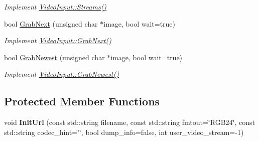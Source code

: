 \begin{DoxyCompactItemize}
\begin{DoxyCompactList}\small\item\em Implement \hyperlink{structpangolin_1_1_video_input_a9030d775d699c39ab7b7ba378c007c6a}{Video\+Input\+::\+Streams()} \end{DoxyCompactList}\item 
bool \hyperlink{classpangolin_1_1_ffmpeg_video_a724f49203ba3d5053edea3a00c227d44}{Grab\+Next} (unsigned char $\ast$image, bool wait=true)\hypertarget{classpangolin_1_1_ffmpeg_video_a724f49203ba3d5053edea3a00c227d44}{}\label{classpangolin_1_1_ffmpeg_video_a724f49203ba3d5053edea3a00c227d44}

\begin{DoxyCompactList}\small\item\em Implement \hyperlink{structpangolin_1_1_video_input_ad3d8ff59c1ec4139320097e6e1111f32}{Video\+Input\+::\+Grab\+Next()} \end{DoxyCompactList}\item 
bool \hyperlink{classpangolin_1_1_ffmpeg_video_ac1c3386eaaee6d3f8de590a635b59106}{Grab\+Newest} (unsigned char $\ast$image, bool wait=true)\hypertarget{classpangolin_1_1_ffmpeg_video_ac1c3386eaaee6d3f8de590a635b59106}{}\label{classpangolin_1_1_ffmpeg_video_ac1c3386eaaee6d3f8de590a635b59106}

\begin{DoxyCompactList}\small\item\em Implement \hyperlink{structpangolin_1_1_video_input_a4c8ac38e3c6a3f591663aeebf645e4c6}{Video\+Input\+::\+Grab\+Newest()} \end{DoxyCompactList}\end{DoxyCompactItemize}
\subsection*{Protected Member Functions}
\begin{DoxyCompactItemize}
\item 
void {\bfseries Init\+Url} (const std\+::string filename, const std\+::string fmtout=\char`\"{}R\+G\+B24\char`\"{}, const std\+::string codec\+\_\+hint=\char`\"{}\char`\"{}, bool dump\+\_\+info=false, int user\+\_\+video\+\_\+stream=-\/1)\hypertarget{classpangolin_1_1_ffmpeg_video_a29ea654733c7355d36e4f4ba246dd3be}{}\label{classpangolin_1_1_ffmpeg_video_a29ea654733c7355d36e4f4ba246dd3be}

\end{DoxyCompactItemize}

